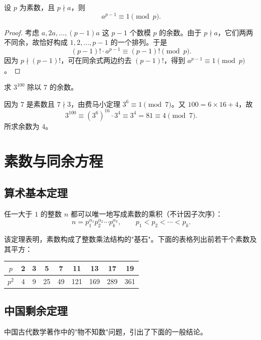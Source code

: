 	\begin{theorem}[费马小定理]
		设 $p$ 为素数，且 $p\nmid a$，则
		\[
			a^{p-1}\equiv 1 \pmod p.
		\]
	\end{theorem}
	\begin{proof}
		考虑 $a,2a,\dots,(p-1)a$ 这 $p-1$ 个数模 $p$ 的余数。由于 $p\nmid a$，它们两两不同余，故恰好构成 $1,2,\dots,p-1$ 的一个排列。于是
		\[
			(p-1)!\cdot a^{p-1}\equiv (p-1)! \pmod p.
		\]
		因为 $p\nmid (p-1)!$，可在同余式两边约去 $(p-1)!$，得到 $a^{p-1}\equiv1\pmod p$。
	\end{proof}

	\begin{exercise}
		求 $3^{100}$ 除以 $7$ 的余数。
	\end{exercise}
	\begin{solution}
		因为 $7$ 是素数且 $7\nmid 3$，由费马小定理 $3^{6}\equiv1\pmod 7$。又 $100=6\times16+4$，故
		\[
			3^{100}\equiv\left(3^{6}\right)^{16}\cdot 3^{4}\equiv 3^{4}=81\equiv 4\pmod 7.
		\]
		所求余数为 $4$。
	\end{solution}

	\chapter{素数与同余方程}
	\section{算术基本定理}
	\begin{theorem}[算术基本定理]
		任一大于 $1$ 的整数 $n$ 都可以唯一地写成素数的乘积（不计因子次序）：
		\[
			n=p_1^{\alpha_1}p_2^{\alpha_2}\cdots p_k^{\alpha_k},
			\qquad p_1<p_2<\cdots<p_k.
		\]
	\end{theorem}
	该定理表明，素数构成了整数乘法结构的"基石"。下面的表格列出前若干个素数及其平方：

	\begin{center}
		\begin{tabular}{c|cccccccc}
			$p$ & 2 & 3 & 5 & 7 & 11 & 13 & 17 & 19 \\
			\hline
			$p^2$ & 4 & 9 & 25 & 49 & 121 & 169 & 289 & 361
		\end{tabular}
	\end{center}

	\section{中国剩余定理}
	中国古代数学著作中的"物不知数"问题，引出了下面的一般结论。

